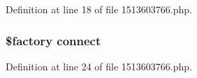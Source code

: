 Definition at line 18 of file 1513603766.\+php.

\subsubsection[{\texorpdfstring{connect}{connect}}]{\setlength{\rightskip}{0pt plus 5cm}\$factory connect}\hypertarget{1513603766_8php_a3fdbedd7713e458f25fcf7dc1f562a3d}{}\label{1513603766_8php_a3fdbedd7713e458f25fcf7dc1f562a3d}


Definition at line 24 of file 1513603766.\+php.

